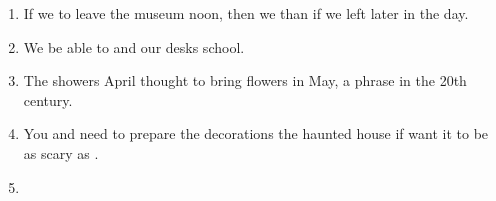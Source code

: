 \begin{enumerate}
\vfill\item

\begin{inparaenum}[A]
If we  to leave the museum  noon, then we    than if we left later in the day. 
\end{inparaenum}

\vfill\item 

\begin{inparaenum}[A]
We  be able to  and  our desks  school. 
\end{inparaenum}

\vfill\item 

\begin{inparaenum}[A]
The showers  April  thought to bring flowers in May,  a phrase  in the 20th century. 
\end{inparaenum}

\vfill\item 

\begin{inparaenum}[A]
You and  need to prepare the decorations  the haunted house if  want it to be as scary as . 
\end{inparaenum}

\vfill\item 


\end{enumerate}
